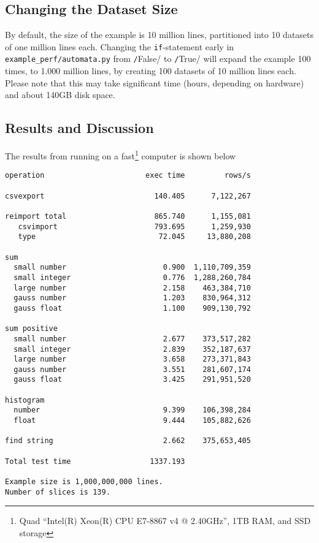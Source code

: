\documentclass[a4paper]{article}
\newcommand{\pyTrue}{\texttt/True/\xspace}
\newcommand{\pyFalse}{\texttt/False/\xspace}
\begin{document}
\subsection*{Changing the Dataset Size}
By default, the size of the example is 10 million lines, partitioned
into 10 datasets of one million lines each.  Changing the
\texttt{if}-statement early in \texttt{example\_perf/automata.py} from
\pyFalse to \pyTrue will expand the example 100 times, to 1.000
million lines, by creating 100 datasets of 10 million lines each.
Please note that this may take significant time (hours, depending on
hardware) and about 140GB disk space.



\clearpage
\subsection*{Results and Discussion}
The results from running on a fast\footnote{Quad ``Intel(R) Xeon(R)
  CPU E7-8867 v4 @ 2.40GHz'', 1TB RAM, and SSD storage} computer
is shown below
\begin{snugshade}
\begin{verbatim}
operation                       exec time         rows/s

csvexport                         140.405      7,122,267

reimport total                    865.740      1,155,081
   csvimport                      793.695      1,259,930
   type                            72.045     13,880,208

sum
  small number                      0.900  1,110,709,359
  small integer                     0.776  1,288,260,784
  large number                      2.158    463,384,710
  gauss number                      1.203    830,964,312
  gauss float                       1.100    909,130,792

sum positive
  small number                      2.677    373,517,282
  small integer                     2.839    352,187,637
  large number                      3.658    273,371,843
  gauss number                      3.551    281,607,174
  gauss float                       3.425    291,951,520

histogram
  number                            9.399    106,398,284
  float                             9.444    105,882,626

find string                         2.662    375,653,405

Total test time                  1337.193

Example size is 1,000,000,000 lines.
Number of slices is 139.
\end{verbatim}
\end{snugshade}
\end{document}
